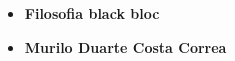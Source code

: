 \begin{itemize}
\item \textbf{Filosofia black bloc} \lipsum[1]
  
\item \textbf{Murilo Duarte Costa Correa} \lipsum[1]
\end{itemize}

